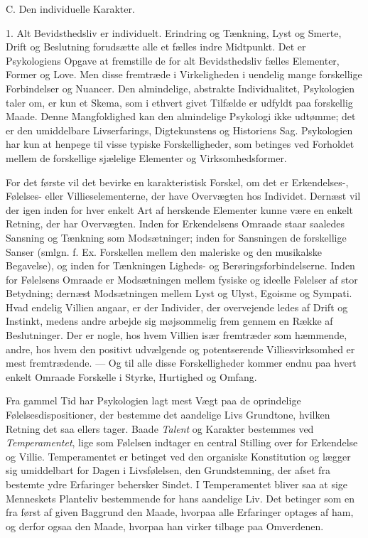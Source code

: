 \documentclass[12pt,a4paper,openany]{book}
\newcommand{\opage}[1]{\marginnote{\footnotesize\textit{[#1]}}}
\begin{document}
\begin{center}C. Den individuelle Karakter.\end{center}

1. Alt Bevidsthedsliv er individuelt. Erindring og Tænkning, Lyst og
Smerte, Drift og Beslutning forudsætte alle et fælles indre Midtpunkt.
Det er Psykologiens Opgave at fremstille de for alt Bevidsthedsliv
fælles Elementer, Former og Love. Men disse fremtræde i Virkeligheden i
uendelig mange forskellige Forbindelser og Nuancer. Den almindelige,
abstrakte Individualitet, Psykologien taler om, er kun et Skema, som i
ethvert givet Tilfælde er udfyldt paa forskellig Maade. Denne
Mangfoldighed kan den almindelige Psykologi ikke udtømme; det er den
umiddelbare Livserfarings, Digtekunstens og Historiens Sag. Psykologien
har kun at henpege til visse typiske Forskelligheder, som betinges ved
Forholdet mellem de forskellige sjælelige Elementer og
Virksomhedsformer.

For det første vil det bevirke en karakteristisk Forskel, om det er
Erkendelses-, Følelses- eller Villieselementerne, der have Overvægten
hos Individet. Dernæst vil der igen inden
\opage{405}for hver enkelt Art af herskende Elementer kunne være en
enkelt Retning, der har Overvægten. Inden for Erkendelsens Omraade staar
saaledes Sansning og Tænkning som Modsætninger; inden for Sansningen de
forskellige Sanser (smlgn. f. Ex. Forskellen mellem den maleriske og den
musikalske Begavelse), og inden for Tænkningen Ligheds- og
Berøringsforbindelserne. Inden for Følelsens Omraade er Modsætningen
mellem fysiske og ideelle Følelser af stor Betydning; dernæst
Modsætningen mellem Lyst og Ulyst, Egoisme og Sympati. Hvad endelig
Villien angaar, er der Individer, der overvejende ledes af Drift og
Instinkt, medens andre arbejde sig møjsommelig frem gennem en Række af
Beslutninger. Der er nogle, hos hvem Villien især fremtræder som
hæmmende, andre, hos hvem den positivt udvælgende og potentserende
Villiesvirksomhed er mest fremtrædende. --- Og til alle disse
Forskelligheder kommer endnu paa hvert enkelt Omraade Forskelle i
Styrke, Hurtighed og Omfang.

Fra gammel Tid har Psykologien lagt mest Vægt paa de oprindelige
Følelsesdispositioner, der bestemme det aandelige Livs Grundtone,
hvilken Retning det saa ellers tager. Baade \emph{Talent} og Karakter
bestemmes ved \emph{Temperamentet}, lige som Følelsen indtager en
central Stilling over for Erkendelse og Villie. Temperamentet er
betinget ved den organiske Konstitution og lægger sig umiddelbart for
Dagen i Livsfølelsen, den Grundstemning, der afset fra bestemte ydre
Erfaringer behersker Sindet. I Temperamentet bliver saa at sige
Menneskets Planteliv bestemmende for hans aandelige Liv. Det betinger
som en fra først af given Baggrund den Maade, hvorpaa alle Erfaringer
optages af ham, og derfor ogsaa den Maade, hvorpaa han virker tilbage
paa Omverdenen.
\end{document}
